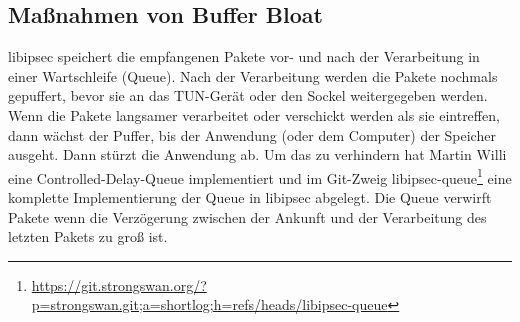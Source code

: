 \subsection{Maßnahmen von Buffer Bloat}
libipsec speichert die empfangenen Pakete vor- und nach der Verarbeitung in einer Wartschleife (Queue).
Nach der Verarbeitung werden die Pakete nochmals gepuffert, bevor sie an das TUN-Gerät oder den Sockel
weitergegeben werden. Wenn die Pakete langsamer verarbeitet oder verschickt werden als sie eintreffen,
dann wächst der Puffer, bis der Anwendung (oder dem Computer) der Speicher ausgeht. Dann stürzt die Anwendung ab.
Um das zu verhindern hat Martin Willi eine Controlled-Delay-Queue implementiert und im Git-Zweig libipsec-queue\footnote{\url{https://git.strongswan.org/?p=strongswan.git;a=shortlog;h=refs/heads/libipsec-queue}} eine komplette Implementierung der Queue in libipsec abgelegt.
Die Queue verwirft Pakete wenn die Verzögerung zwischen der Ankunft und der Verarbeitung
des letzten Pakets zu groß ist.
